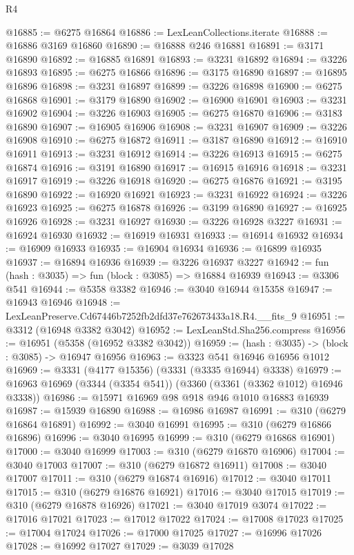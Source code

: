 \begin{lexlean}{R4}
\begin{coremodule}
@16885 := @6275 @16864
@16886 := LexLeanCollections.iterate
@16888 := @16886 @3169 @16860
@16890 := @16888 @246 @16881
@16891 := @3171 @16890
@16892 := @16885 @16891
@16893 := @3231 @16892
@16894 := @3226 @16893
@16895 := @6275 @16866
@16896 := @3175 @16890
@16897 := @16895 @16896
@16898 := @3231 @16897
@16899 := @3226 @16898
@16900 := @6275 @16868
@16901 := @3179 @16890
@16902 := @16900 @16901
@16903 := @3231 @16902
@16904 := @3226 @16903
@16905 := @6275 @16870
@16906 := @3183 @16890
@16907 := @16905 @16906
@16908 := @3231 @16907
@16909 := @3226 @16908
@16910 := @6275 @16872
@16911 := @3187 @16890
@16912 := @16910 @16911
@16913 := @3231 @16912
@16914 := @3226 @16913
@16915 := @6275 @16874
@16916 := @3191 @16890
@16917 := @16915 @16916
@16918 := @3231 @16917
@16919 := @3226 @16918
@16920 := @6275 @16876
@16921 := @3195 @16890
@16922 := @16920 @16921
@16923 := @3231 @16922
@16924 := @3226 @16923
@16925 := @6275 @16878
@16926 := @3199 @16890
@16927 := @16925 @16926
@16928 := @3231 @16927
@16930 := @3226 @16928 @3227
@16931 := @16924 @16930
@16932 := @16919 @16931
@16933 := @16914 @16932
@16934 := @16909 @16933
@16935 := @16904 @16934
@16936 := @16899 @16935
@16937 := @16894 @16936
@16939 := @3226 @16937 @3227
@16942 := fun (hash : @3035) => fun (block : @3085) => @16884 @16939
@16943 := @3306 @541
@16944 := @5358 @3382
@16946 := @3040 @16944 @15358
@16947 := @16943 @16946
@16948 := LexLeanPreserve.Cd67446b7252fb2dfd37e762673433a18.R4.__fits_9
@16951 := @3312 (@16948 @3382 @3042)
@16952 := LexLeanStd.Sha256.compress
@16956 := @16951 (@5358 (@16952 @3382 @3042))
@16959 := (hash : @3035) -> (block : @3085) -> @16947 @16956
@16963 := @3323 @541 @16946 @16956 @1012
@16969 := @3331 (@4177 @15356) (@3331 (@3335 @16944) @3338)
@16979 := @16963 @16969 (@3344 (@3354 @541)) (@3360 (@3361 (@3362 @1012) @16946 @3338))
@16986 := @15971 @16969 @98 @918 @946 @1010 @16883 @16939
@16987 := @15939 @16890
@16988 := @16986 @16987
@16991 := @310 (@6279 @16864 @16891)
@16992 := @3040 @16991
@16995 := @310 (@6279 @16866 @16896)
@16996 := @3040 @16995
@16999 := @310 (@6279 @16868 @16901)
@17000 := @3040 @16999
@17003 := @310 (@6279 @16870 @16906)
@17004 := @3040 @17003
@17007 := @310 (@6279 @16872 @16911)
@17008 := @3040 @17007
@17011 := @310 (@6279 @16874 @16916)
@17012 := @3040 @17011
@17015 := @310 (@6279 @16876 @16921)
@17016 := @3040 @17015
@17019 := @310 (@6279 @16878 @16926)
@17021 := @3040 @17019 @3074
@17022 := @17016 @17021
@17023 := @17012 @17022
@17024 := @17008 @17023
@17025 := @17004 @17024
@17026 := @17000 @17025
@17027 := @16996 @17026
@17028 := @16992 @17027
@17029 := @3039 @17028

\end{coremodule}
\end{lexlean}
